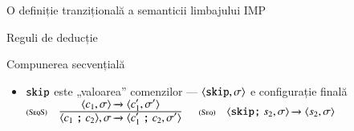 \documentclass[handout,xcolor=pdftex,romanian,colorlinks]{beamer}
\begin{document}
\begin{section}{O definiție tranzițională a semanticii limbajului IMP}
\begin{subsection}{Reguli de deducție}
\begin{frame}{Compunerea secvențială}
\begin{itemize}
\item $\mathrel{\text{\ttfamily skip}}$ este „valoarea” comenzilor — ${\langle{\ensuremath\mathrel{\text{\ttfamily skip}},\sigma}\rangle}$ e configurație finală
\vitem[] $\reg[SeqS]{\Ss{\c{c_1 \terminal{;} c_2},\sigma}{\c{c_1' \terminal{;} c_2,\sigma'}}}{\Ss{\c{c_1,\sigma}}{\c{c_1',\sigma'}}}{}$
\vitem[] $\reg[Seq]{\Ss{\c{\terminal{skip} \terminal{;} s_2,\sigma}}{\c{s_2,\sigma}}}{}{}$
\end{itemize}
\end{frame}


\end{subsection}
\end{section}
\end{document}
